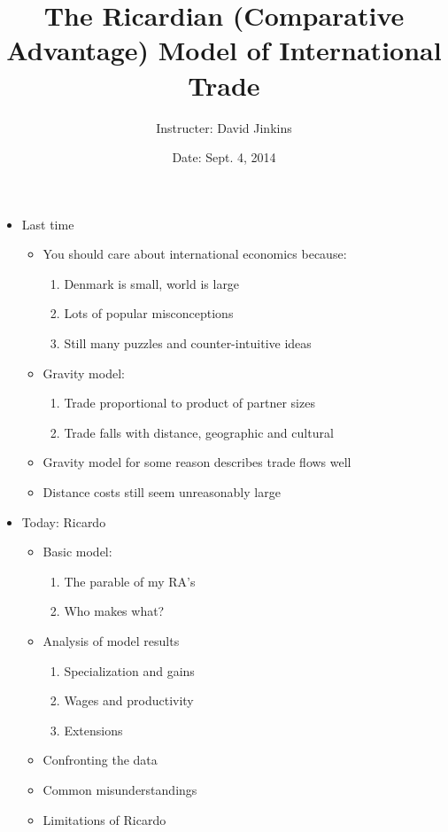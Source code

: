 \documentclass[ignorenonframetext,]{beamer}
\title{The Ricardian (Comparative Advantage) Model of International Trade}
\author{Instructer: David Jinkins}
\date{Date: Sept. 4, 2014}
\begin{document}
\frame{\titlepage}

\begin{frame}
\begin{itemize}
\itemsep1pt\parskip0pt
\item
  Last time 

  \begin{itemize}
  \itemsep1pt\parskip0pt
  \item You should care about international economics because:
      \begin{enumerate}
          \item Denmark is small, world is large
          \item Lots of popular misconceptions
          \item Still many puzzles and counter-intuitive ideas
      \end{enumerate}
  \item Gravity model:
      \begin{enumerate}
          \item Trade proportional to product of partner sizes 
          \item Trade falls with distance, geographic and cultural 
      \end{enumerate}
  \item Gravity model for some reason describes trade flows well
  \item Distance costs still seem unreasonably large 
  \end{itemize}
\end{itemize}

\end{frame}

\begin{frame}
\begin{itemize}
\itemsep1pt\parskip0pt
\item
  Today: Ricardo

  \begin{itemize}
  \itemsep1pt\parskip0pt
  \item Basic model:
  \begin{enumerate}
    \item The parable of my RA's
    \item Who makes what?
  \end{enumerate}
  \item Analysis of model results 
  \begin{enumerate}
    \item Specialization and gains 
    \item Wages and productivity 
    \item Extensions
  \end{enumerate}
  \item Confronting the data 
  \item Common misunderstandings
  \item Limitations of Ricardo
  \end{itemize}
\end{itemize}

\end{frame}
\end{document}
